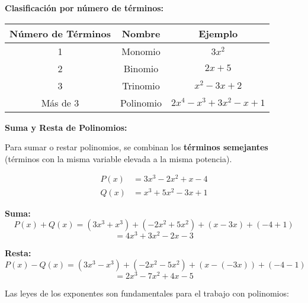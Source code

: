 \textbf{Clasificación por número de términos:}

\begin{center}
\begin{tabular}{|c|c|c|}
\hline
\textbf{Número de Términos} & \textbf{Nombre} & \textbf{Ejemplo} \\
\hline
1 & Monomio & $3x^2$ \\
\hline
2 & Binomio & $2x + 5$ \\
\hline
3 & Trinomio & $x^2 - 3x + 2$ \\
\hline
Más de 3 & Polinomio & $2x^4 - x^3 + 3x^2 - x + 1$ \\
\hline
\end{tabular}
\end{center}


\textbf{Suma y Resta de Polinomios:}

Para sumar o restar polinomios, se combinan los \textbf{términos semejantes} (términos con la misma variable elevada a la misma potencia).

\begin{example}
\begin{align}
P(x) &= 3x^3 - 2x^2 + x - 4 \\
Q(x) &= x^3 + 5x^2 - 3x + 1
\end{align}

\textbf{Suma:}
$$P(x) + Q(x) = (3x^3 + x^3) + (-2x^2 + 5x^2) + (x - 3x) + (-4 + 1)$$
$$= 4x^3 + 3x^2 - 2x - 3$$

\textbf{Resta:}
$$P(x) - Q(x) = (3x^3 - x^3) + (-2x^2 - 5x^2) + (x - (-3x)) + (-4 - 1)$$
$$= 2x^3 - 7x^2 + 4x - 5$$
\end{example}


Las leyes de los exponentes son fundamentales para el trabajo con polinomios:

